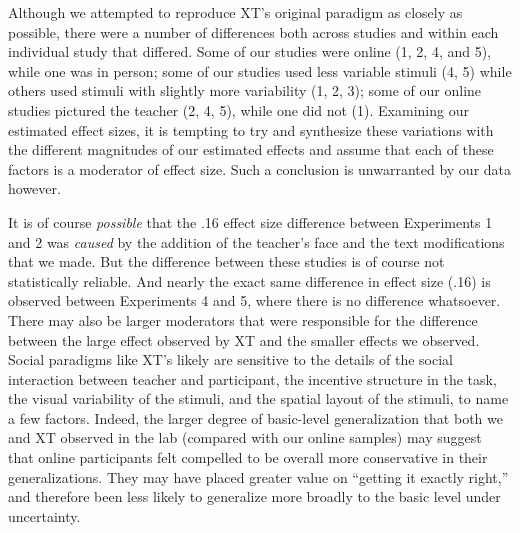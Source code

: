 \documentclass[man]{apa2}
\begin{document}
Although we attempted to reproduce XT's original paradigm as closely as possible, there were a number of differences both across studies and within each individual study that differed. Some of our studies were online (1, 2, 4, and 5), while one was in person; some of our studies used less variable stimuli (4, 5) while others used stimuli with slightly more variability (1, 2, 3); some of our online studies pictured the teacher (2, 4, 5), while one did not (1). Examining our estimated effect sizes, it is tempting to try and synthesize these variations with the different magnitudes of our estimated effects and assume that each of these factors is a moderator of effect size. Such a conclusion is unwarranted by our data however. 

It is of course \emph{possible} that the .16 effect size difference between Experiments 1 and 2 was \emph{caused} by the addition of the teacher's face and the text modifications that we made. But the difference between these studies is of course not statistically reliable. And nearly the exact same difference in effect size (.16) is observed between Experiments 4 and 5, where there is no difference whatsoever. 
There may also be larger moderators that were responsible for the difference between the large effect observed by XT and the smaller effects we observed. Social paradigms like XT's likely are sensitive to the details of the social interaction between teacher and participant, the incentive structure in the task, the visual variability of the stimuli, and the spatial layout of the stimuli, to name a few factors. Indeed, the larger degree of basic-level generalization that both we and XT observed in the lab (compared with our online samples) may suggest that online participants felt compelled to be overall more conservative in their generalizations. They may have placed greater value on ``getting it exactly right,'' and therefore been less likely to generalize more broadly to the basic level under uncertainty. 
\end{document}
